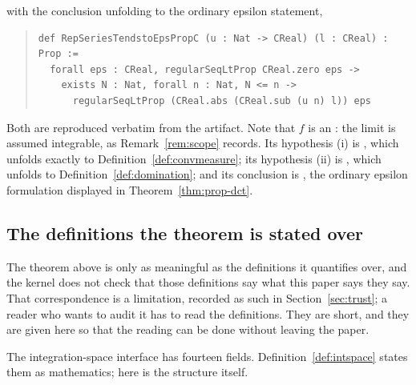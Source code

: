 \documentclass[11pt]{article}
\theoremstyle{definition}
\theoremstyle{remark}
\begin{document}
\noindent with the conclusion unfolding to the ordinary epsilon statement,

\begin{quote}\small
\begin{verbatim}
def RepSeriesTendstoEpsPropC (u : Nat -> CReal) (l : CReal) : Prop :=
  forall eps : CReal, regularSeqLtProp CReal.zero eps ->
    exists N : Nat, forall n : Nat, N <= n ->
      regularSeqLtProp (CReal.abs (CReal.sub (u n) l)) eps
\end{verbatim}
\end{quote}

\noindent Both are reproduced verbatim from the artifact.  Note that $f$ is an
: the limit is assumed integrable, as Remark~\ref{rem:scope} records.
Its hypothesis (i) is , which unfolds exactly to Definition~\ref{def:convmeasure}; its hypothesis (ii) is , which unfolds to Definition~\ref{def:domination}; and its conclusion is , the ordinary epsilon formulation displayed in Theorem~\ref{thm:prop-dct}.

\subsection{The definitions the theorem is stated over}
\label{sec:definitions-lean}

The theorem above is only as meaningful as the definitions it quantifies over, and
the kernel does not check that those definitions say what this paper says they say.
That correspondence is a limitation, recorded as such in Section~\ref{sec:trust}; a
reader who wants to audit it has to read the definitions. They are short, and they
are given here so that the reading can be done without leaving the paper.

The integration-space interface has fourteen fields. Definition~\ref{def:intspace}
states them as mathematics; here is the structure itself.
\end{document}
